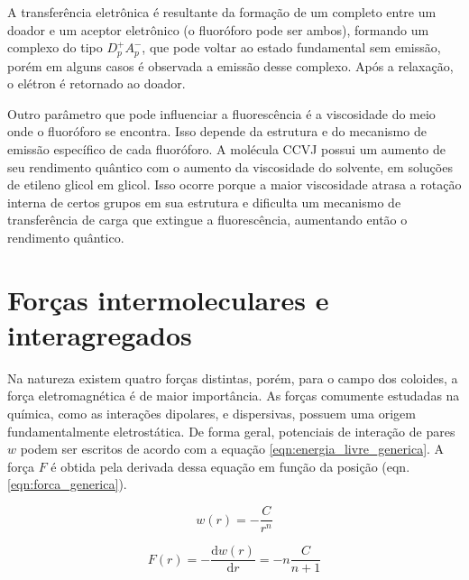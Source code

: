 		A transferência eletrônica é resultante da formação de um completo entre um doador e um aceptor eletrônico (o fluoróforo pode ser ambos), formando um complexo do tipo \(D_p^+A_p^-\), que pode voltar ao estado fundamental sem emissão, porém em alguns casos é observada a emissão desse complexo. Após a relaxação, o elétron é retornado ao doador. 
		
		Outro parâmetro que pode influenciar a fluorescência é a viscosidade do meio onde o fluoróforo se encontra. Isso depende da estrutura e do mecanismo de emissão específico de cada fluoróforo. A molécula CCVJ possui um aumento de seu rendimento quântico com o aumento da viscosidade do solvente, em soluções de etileno glicol em glicol. Isso ocorre porque a maior viscosidade atrasa a rotação interna de certos grupos em sua estrutura e dificulta um mecanismo de transferência de carga que extingue a fluorescência, aumentando então o rendimento quântico.
		
		
		
	\chapter{Forças intermoleculares e interagregados}
	
	Na natureza existem quatro forças distintas, porém, para o campo dos coloides, a força eletromagnética é de maior importância. As forças comumente estudadas na química, como as interações dipolares, e dispersivas, possuem uma origem fundamentalmente eletrostática. De forma geral, potenciais de interação de pares \(w\) podem ser escritos de acordo com a equação \ref{eqn:energia_livre_generica}. A força \(F\) é obtida pela derivada dessa equação em função da posição (eqn. \ref{eqn:forca_generica}).
	
	\begin{equation}
		w(r) = -\dfrac{C}{r^n}
		\label{eqn:energia_livre_generica}
	\end{equation}
	
	\begin{equation}
		F(r) = -\dfrac{\mathrm{d}w(r)}{\mathrm{d}r} = -n \dfrac{C}{n+1}
		\label{eqn:forca_generica}
	\end{equation}
	
